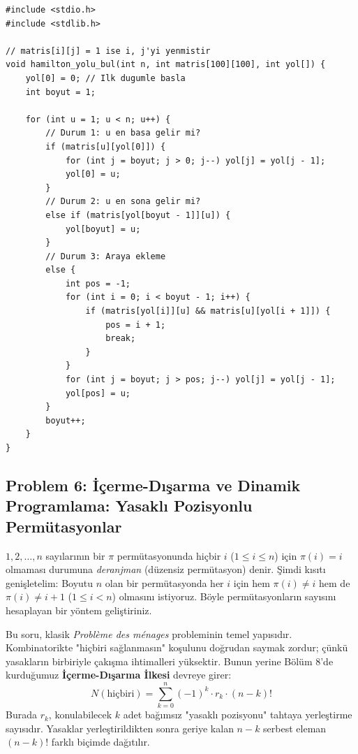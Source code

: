 \begin{lstlisting}[language=CTemel]
#include <stdio.h>
#include <stdlib.h>

// matris[i][j] = 1 ise i, j'yi yenmistir
void hamilton_yolu_bul(int n, int matris[100][100], int yol[]) {
    yol[0] = 0; // Ilk dugumle basla
    int boyut = 1;
    
    for (int u = 1; u < n; u++) {
        // Durum 1: u en basa gelir mi?
        if (matris[u][yol[0]]) {
            for (int j = boyut; j > 0; j--) yol[j] = yol[j - 1];
            yol[0] = u;
        }
        // Durum 2: u en sona gelir mi?
        else if (matris[yol[boyut - 1]][u]) {
            yol[boyut] = u;
        }
        // Durum 3: Araya ekleme
        else {
            int pos = -1;
            for (int i = 0; i < boyut - 1; i++) {
                if (matris[yol[i]][u] && matris[u][yol[i + 1]]) {
                    pos = i + 1;
                    break;
                }
            }
            for (int j = boyut; j > pos; j--) yol[j] = yol[j - 1];
            yol[pos] = u;
        }
        boyut++;
    }
}
\end{lstlisting}

\subsection{Problem 6: İçerme-Dışarma ve Dinamik Programlama: Yasaklı Pozisyonlu Permütasyonlar}

\begin{example}
$1, 2, \dots, n$ sayılarının bir $\pi$ permütasyonunda hiçbir $i$ ($1 \le i \le n$) için $\pi(i) = i$ olmaması durumuna \emph{deranjman} (düzensiz permütasyon) denir.
Şimdi kısıtı genişletelim:
Boyutu $n$ olan bir permütasyonda her $i$ için hem $\pi(i) \neq i$ hem de $\pi(i) \neq i+1$ ($1 \le i < n$) olmasını istiyoruz.
Böyle permütasyonların sayısını hesaplayan bir yöntem geliştiriniz.
\end{example}

Bu soru, klasik \emph{Problème des ménages} probleminin temel yapısıdır.
Kombinatorikte "hiçbiri sağlanmasın" koşulunu doğrudan saymak zordur; çünkü yasakların birbiriyle çakışma ihtimalleri yüksektir.
Bunun yerine Bölüm 8'de kurduğumuz \textbf{İçerme-Dışarma İlkesi} devreye girer:
\[
N(\text{hiçbiri}) = \sum_{k=0}^{n} (-1)^k \cdot r_k \cdot (n - k)!
\]
Burada $r_k$, konulabilecek $k$ adet bağımsız "yasaklı pozisyonu" tahtaya yerleştirme sayısıdır. Yasaklar yerleştirildikten sonra geriye kalan $n-k$ serbest eleman $(n-k)!$ farklı biçimde dağıtılır.

